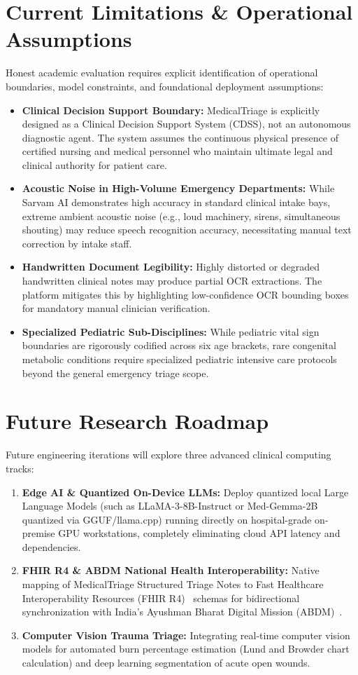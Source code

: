 \documentclass[11pt,a4paper,oneside]{report}
\begin{document}
\section{Current Limitations \& Operational Assumptions}
Honest academic evaluation requires explicit identification of operational boundaries, model constraints, and foundational deployment assumptions:
\begin{itemize}[leftmargin=20pt]
  \item \textbf{Clinical Decision Support Boundary:} MedicalTriage is explicitly designed as a Clinical Decision Support System (CDSS), not an autonomous diagnostic agent. The system assumes the continuous physical presence of certified nursing and medical personnel who maintain ultimate legal and clinical authority for patient care.
  \item \textbf{Acoustic Noise in High-Volume Emergency Departments:} While Sarvam AI demonstrates high accuracy in standard clinical intake bays, extreme ambient acoustic noise (e.g., loud machinery, sirens, simultaneous shouting) may reduce speech recognition accuracy, necessitating manual text correction by intake staff.
  \item \textbf{Handwritten Document Legibility:} Highly distorted or degraded handwritten clinical notes may produce partial OCR extractions. The platform mitigates this by highlighting low-confidence OCR bounding boxes for mandatory manual clinician verification.
  \item \textbf{Specialized Pediatric Sub-Disciplines:} While pediatric vital sign boundaries are rigorously codified across six age brackets, rare congenital metabolic conditions require specialized pediatric intensive care protocols beyond the general emergency triage scope.
\end{itemize}

\section{Future Research Roadmap}
Future engineering iterations will explore three advanced clinical computing tracks:
\begin{enumerate}[leftmargin=20pt]
  \item \textbf{Edge AI \& Quantized On-Device LLMs:} Deploy quantized local Large Language Models (such as LLaMA-3-8B-Instruct or Med-Gemma-2B quantized via GGUF/llama.cpp) running directly on hospital-grade on-premise GPU workstations, completely eliminating cloud API latency and dependencies.
  \item \textbf{FHIR R4 \& ABDM National Health Interoperability:} Native mapping of MedicalTriage Structured Triage Notes to Fast Healthcare Interoperability Resources (FHIR R4)~\cite{fhir2019} schemas for bidirectional synchronization with India's Ayushman Bharat Digital Mission (ABDM)~\cite{abdm2022}.
  \item \textbf{Computer Vision Trauma Triage:} Integrating real-time computer vision models for automated burn percentage estimation (Lund and Browder chart calculation) and deep learning segmentation of acute open wounds.
\end{enumerate}
\end{document}
